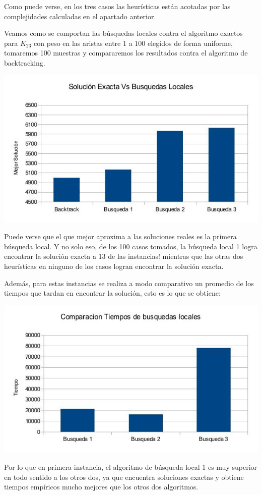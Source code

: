 Como puede verse, en los tres casos las heurísticas están acotadas por las complejidades calculadas en el apartado anterior.

Veamos como se comportan las búsquedas locales contra el algoritmo exactos para $K_23$ con peso en las aristas entre $1$ a $100$ elegidos de forma uniforme, tomaremos 100 muestras y compararemos los resultados contra el algoritmo de backtracking.

\includegraphics[scale=0.5]{Ej4/solucionestodos.jpg}

Puede verse que el que mejor aproxima a las soluciones reales es la primera búsqueda local. Y no solo eso, de los 100 casos tomados, la búsqueda local 1 logra encontrar la solución exacta a 13 de las instancias! mientras que las otras dos heurísticas en ninguno de los casos logran encontrar la solución exacta.

Además, para estas instancias se realiza a modo comparativo un promedio de los tiempos que tardan en encontrar la solución, esto es lo que se obtiene:

\includegraphics[scale=0.5]{Ej4/tiempotodos.jpg}

Por lo que en primera instancia, el algoritmo de búsqueda local 1 es muy superior en todo sentido a los otros dos, ya que encuentra soluciones exactas y obtiene tiempos empíricos mucho mejores que los otros dos algoritmos.
